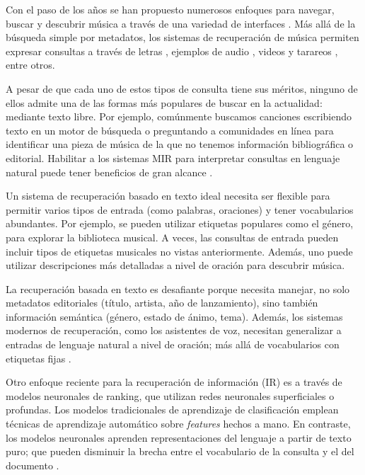 Con el paso de los años se han propuesto numerosos enfoques para navegar, buscar y descubrir música a través de una variedad de interfaces \cite{Manco2022ContrastiveAL}. Más allá de la búsqueda simple por metadatos, los sistemas de recuperación de música permiten expresar consultas a través de letras \cite{Tsukuda2017LyricJA}, ejemplos de audio \cite{Lee2020DisentangledMM}, videos \cite{Li2019QueryBV} y tarareos \cite{Patel2021MusicRS}, entre otros.

A pesar de que cada uno de estos tipos de consulta tiene sus méritos, ninguno de ellos admite una de las formas más populares de buscar en la actualidad: mediante texto libre. Por ejemplo, comúnmente buscamos canciones escribiendo texto en un motor de búsqueda o preguntando a comunidades en línea para identificar una pieza de música de la que no tenemos información bibliográfica o editorial. Habilitar a los sistemas MIR para interpretar consultas en lenguaje natural puede tener beneficios de gran alcance \cite{Manco2022ContrastiveAL}.

Un sistema de recuperación basado en texto ideal necesita ser flexible para permitir varios tipos de entrada (como palabras, oraciones) y tener vocabularios abundantes. Por ejemplo, se pueden utilizar etiquetas populares como el género, para explorar la biblioteca musical. A veces, las consultas de entrada pueden incluir tipos de etiquetas musicales no vistas anteriormente. Además, uno puede utilizar descripciones más detalladas a nivel de oración para descubrir música. %

La recuperación basada en texto es desafiante porque necesita manejar, no solo metadatos editoriales (título, artista, año de lanzamiento), sino también información semántica (género, estado de ánimo, tema). Además, los sistemas modernos de recuperación, como los asistentes de voz, necesitan generalizar a entradas de lenguaje natural a nivel de oración; más allá de vocabularios con etiquetas fijas \cite{Doh2022TowardUT}.

Otro enfoque reciente para la recuperación de información (IR) es a través de modelos neuronales de ranking, que utilizan redes neuronales superficiales o profundas. Los modelos tradicionales de aprendizaje de clasificación emplean técnicas de aprendizaje automático sobre \textit{features} hechos a mano. En contraste, los modelos neuronales aprenden representaciones del lenguaje a partir de texto puro; que pueden disminuir la brecha entre el vocabulario de la consulta y el del documento \cite{Mitra2017NeuralMF}.

